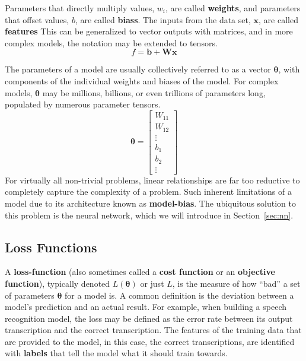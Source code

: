 \documentclass[12pt]{report}
\theoremstyle{definition}
\theoremstyle{remark}
\begin{document}
Parameters that directly multiply values, $w_i$, are called \textbf{\glspl{weight}}, and parameters that offset values, $b$, are called \textbf{\glspl{bias}}. The inputs from the data set, $\mathbf{x}$, are called \textbf{\glspl{feature}} This can be generalized to vector outputs with matrices, and in more complex models, the notation may be extended to tensors.
\begin{equation}
    f = \mathbf{b} + \mathbf{W}\mathbf{x}
\end{equation}

The parameters of a model are usually collectively referred to as a vector $\boldsymbol{\theta}$, with components of the individual weights and biases of the model. For complex models, $\boldsymbol{\theta}$ may be millions, billions, or even trillions of parameters long, populated by numerous parameter tensors.
\begin{equation}
    \boldsymbol{\theta} = \begin{bmatrix}
        W_{11} \\
        W_{12} \\
        \vdots \\
        b_1 \\
        b_2 \\
        \vdots
    \end{bmatrix}
\end{equation}
For virtually all non-trivial problems, linear relationships are far too reductive to completely capture the complexity of a problem. Such inherent limitations of a model due to its architecture known as \textbf{\gls{model-bias}}. The ubiquitous solution to this problem is the neural network, which we will introduce in Section~\ref{sec:nn}.


\subsection{Loss Functions}

A \textbf{\gls{loss-function}} (also sometimes called a \textbf{cost function} or an \textbf{objective function}), typically denoted $L(\boldsymbol{\theta})$ or just $L$, is the measure of how ``bad'' a set of parameters $\boldsymbol{\theta}$ for a model is. A common definition is the deviation between a model's prediction and an actual result. For example, when building a speech recognition model, the loss may be defined as the error rate between its output transcription and the correct transcription. The features of the training data that are provided to the model, in this case, the correct transcriptions, are identified with \textbf{\glspl{label}} that tell the model what it should train towards.
\end{document}
